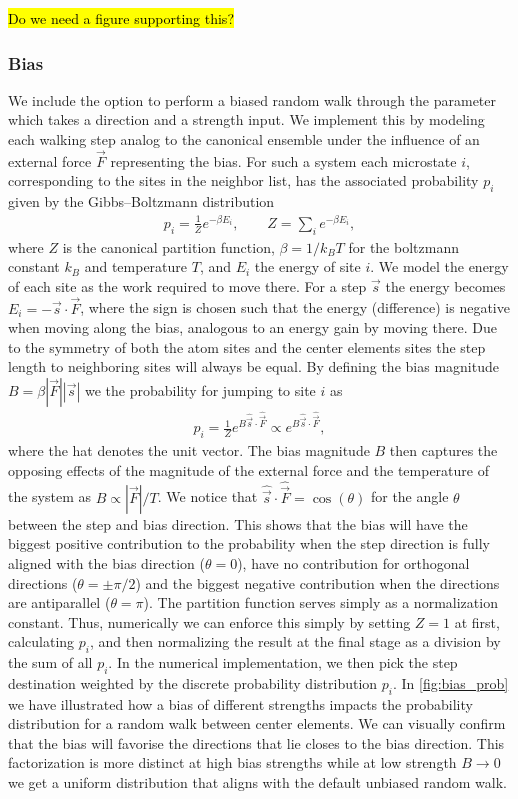 \hl{Do we need a figure supporting this?}

\subsubsection{Bias} %
We include the option to perform a biased random walk through the  parameter which takes a direction and a strength input. We implement this by modeling each
walking step analog to the canonical ensemble under the influence of an
external force $\vec{F}$ representing the bias. For such a system each
microstate $i$, corresponding to the sites in the neighbor list, has the
associated probability $p_i$ given by the Gibbs–Boltzmann distribution
\begin{align*}
  p_{i} = \frac{1}{Z}e^{-\beta E_i}, \qquad Z = \sum_i e^{-\beta E_i},
\end{align*}
where $Z$ is the canonical partition function, $\beta = 1/k_B T$ for the
boltzmann constant $k_B$ and temperature $T$, and $E_i$ the energy of site $i$.
We model the energy of each site as the work required to move there. For a step
$\vec{s}$ the energy becomes $E_i = -\vec{s}\cdot\vec{F}$, where the sign is chosen such that the energy (difference) is negative when moving along the bias, analogous to an energy gain by
moving there. Due to the symmetry of both the atom sites and the center elements
sites the step length to neighboring sites will always be equal. By defining
the bias magnitude $B = \beta|\vec{F}||\vec{s}|$ we the probability for
jumping to site $i$ as
\begin{align*}
  p_i = \frac{1}{Z}e^{B\hat{\vec{s}}\cdot\hat{\vec{F}}} \propto e^{B\hat{\vec{s}}\cdot\hat{\vec{F}}},
\end{align*}
 where the hat denotes the unit vector. The bias magnitude $B$ then captures the opposing effects of the magnitude of the external force and the
 temperature of the system as $B\propto |\vec{F}|/T$. We notice that
 $\hat{\vec{s}}\cdot\hat{\vec{F}} = \cos{(\theta)}$ for the angle $\theta$
 between the step and bias direction. This shows that the bias will have the
 biggest positive contribution to the probability when the step direction is fully aligned with the bias
 direction ($\theta = 0$), have no contribution for orthogonal directions
 ($\theta = \pm \pi/2$) and the biggest negative contribution when the directions
 are antiparallel ($\theta = \pi$). The partition function serves simply as a
 normalization constant. Thus, numerically we can enforce this simply by setting $Z = 1$ at first, calculating $p_i$, and then normalizing the result at the final stage as a
 division by the sum of all $p_i$. In the numerical implementation, we then pick
 the step destination weighted by the discrete probability distribution $p_i$. In
 \cref{fig:bias_prob} we have illustrated how a bias of different strengths impacts the probability distribution for a random walk between center elements. We can visually confirm that the bias will favorise the directions that lie closes to the bias direction. This factorization is more distinct at high bias strengths while at low strength $B\to0$ we get a uniform distribution that aligns with the default unbiased random walk. 

